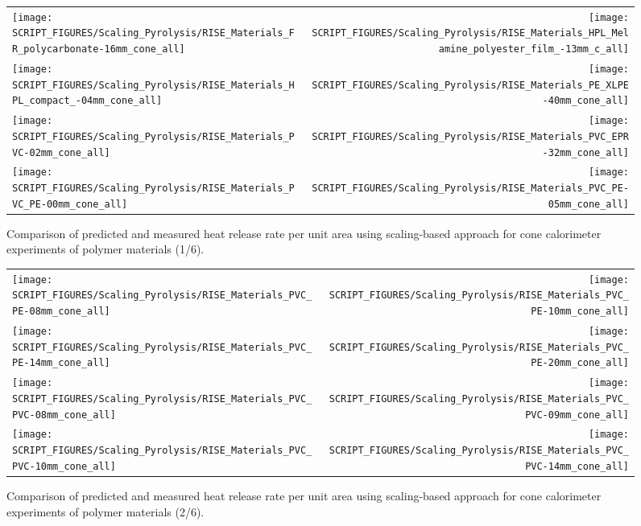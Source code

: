 \begin{figure}[!h]
\begin{tabular*}{\textwidth}{l@{\extracolsep{\fill}}r}
\texttt{[image: SCRIPT\_FIGURES/Scaling\_Pyrolysis/RISE\_Materials\_FR\_polycarbonate-16mm\_cone\_all]} &
\texttt{[image: SCRIPT\_FIGURES/Scaling\_Pyrolysis/RISE\_Materials\_HPL\_Melamine\_polyester\_film\_-13mm\_c\_all]} \\
\texttt{[image: SCRIPT\_FIGURES/Scaling\_Pyrolysis/RISE\_Materials\_HPL\_compact\_-04mm\_cone\_all]} &
\texttt{[image: SCRIPT\_FIGURES/Scaling\_Pyrolysis/RISE\_Materials\_PE\_XLPE-40mm\_cone\_all]} \\
\texttt{[image: SCRIPT\_FIGURES/Scaling\_Pyrolysis/RISE\_Materials\_PVC-02mm\_cone\_all]} &
\texttt{[image: SCRIPT\_FIGURES/Scaling\_Pyrolysis/RISE\_Materials\_PVC\_EPR-32mm\_cone\_all]} \\
\texttt{[image: SCRIPT\_FIGURES/Scaling\_Pyrolysis/RISE\_Materials\_PVC\_PE-00mm\_cone\_all]} &
\texttt{[image: SCRIPT\_FIGURES/Scaling\_Pyrolysis/RISE\_Materials\_PVC\_PE-05mm\_cone\_all]} \\
\end{tabular*}
\caption[HRRPUA of RISE materials using scaling model, polymer materials]
{Comparison of predicted and measured heat release rate per unit area using scaling-based approach for cone calorimeter experiments of polymer materials (1/6).}
\label{RISE_Materials_polymers1}
\end{figure}

\begin{figure}[!h]
\begin{tabular*}{\textwidth}{l@{\extracolsep{\fill}}r}
\texttt{[image: SCRIPT\_FIGURES/Scaling\_Pyrolysis/RISE\_Materials\_PVC\_PE-08mm\_cone\_all]} &
\texttt{[image: SCRIPT\_FIGURES/Scaling\_Pyrolysis/RISE\_Materials\_PVC\_PE-10mm\_cone\_all]} \\
\texttt{[image: SCRIPT\_FIGURES/Scaling\_Pyrolysis/RISE\_Materials\_PVC\_PE-14mm\_cone\_all]} &
\texttt{[image: SCRIPT\_FIGURES/Scaling\_Pyrolysis/RISE\_Materials\_PVC\_PE-20mm\_cone\_all]} \\
\texttt{[image: SCRIPT\_FIGURES/Scaling\_Pyrolysis/RISE\_Materials\_PVC\_PVC-08mm\_cone\_all]} &
\texttt{[image: SCRIPT\_FIGURES/Scaling\_Pyrolysis/RISE\_Materials\_PVC\_PVC-09mm\_cone\_all]} \\
\texttt{[image: SCRIPT\_FIGURES/Scaling\_Pyrolysis/RISE\_Materials\_PVC\_PVC-10mm\_cone\_all]} &
\texttt{[image: SCRIPT\_FIGURES/Scaling\_Pyrolysis/RISE\_Materials\_PVC\_PVC-14mm\_cone\_all]} \\
\end{tabular*}
\caption[HRRPUA of RISE materials using scaling model, polymer materials]
{Comparison of predicted and measured heat release rate per unit area using scaling-based approach for cone calorimeter experiments of polymer materials (2/6).}
\label{RISE_Materials_polymers2}
\end{figure}


